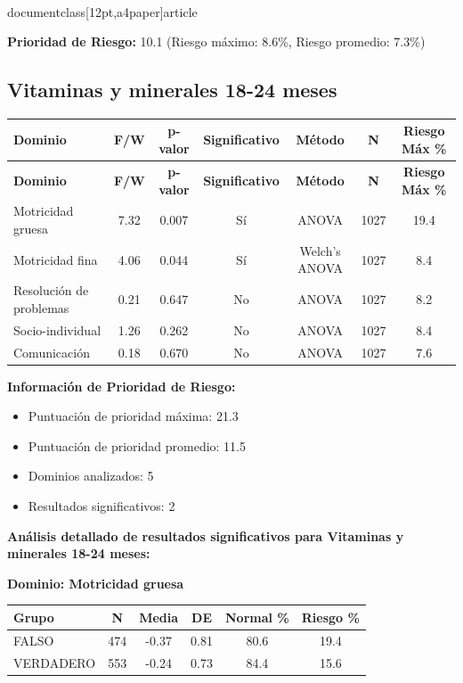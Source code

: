 \\documentclass[12pt,a4paper]{article}
\begin{document}
\textbf{Prioridad de Riesgo:} 10.1 (Riesgo máximo: 8.6\%, Riesgo promedio: 7.3\%)


\vspace{0.5cm}


\subsection{Vitaminas y minerales 18-24 meses}


\begin{longtable}{|l|c|c|c|c|c|c|}
\hline
\textbf{Dominio} & \textbf{F/W} & \textbf{p-valor} & \textbf{Significativo} & \textbf{Método} & \textbf{N} & \textbf{Riesgo Máx \%} \\
\hline
\endfirsthead

\hline
\textbf{Dominio} & \textbf{F/W} & \textbf{p-valor} & \textbf{Significativo} & \textbf{Método} & \textbf{N} & \textbf{Riesgo Máx \%} \\
\hline
\endhead

\hline
\endfoot

\hline
\endlastfoot

Motricidad gruesa & 7.32 & 0.007 & Sí & ANOVA & 1027 & 19.4 \\
Motricidad fina & 4.06 & 0.044 & Sí & Welch's ANOVA & 1027 & 8.4 \\
Resolución de problemas & 0.21 & 0.647 & No & ANOVA & 1027 & 8.2 \\
Socio-individual & 1.26 & 0.262 & No & ANOVA & 1027 & 8.4 \\
Comunicación & 0.18 & 0.670 & No & ANOVA & 1027 & 7.6 \\

\end{longtable}


\textbf{Información de Prioridad de Riesgo:}
\begin{itemize}
\item Puntuación de prioridad máxima: 21.3
\item Puntuación de prioridad promedio: 11.5
\item Dominios analizados: 5
\item Resultados significativos: 2
\end{itemize}


\textbf{Análisis detallado de resultados significativos para Vitaminas y minerales 18-24 meses:}


\textbf{Dominio: Motricidad gruesa}


\begin{center}
\begin{tabular}{|l|c|c|c|c|c|}
\hline
\textbf{Grupo} & \textbf{N} & \textbf{Media} & \textbf{DE} & \textbf{Normal \%} & \textbf{Riesgo \%} \\
\hline
FALSO & 474 & -0.37 & 0.81 & 80.6 & 19.4 \\
VERDADERO & 553 & -0.24 & 0.73 & 84.4 & 15.6 \\

\hline
\end{tabular}
\end{center}
\end{document}
